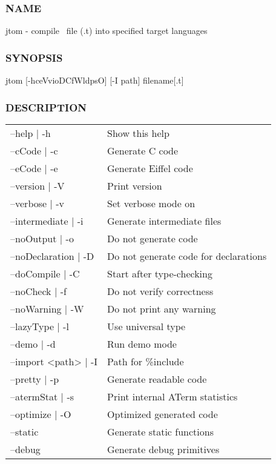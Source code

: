 \subsubsection{NAME}
     jtom - compile \TOM\ file (.t) into specified target languages

\subsubsection{SYNOPSIS}
     jtom [-hceVvioDCfWldpsO] [-I path] filename[.t]

\subsubsection{DESCRIPTION}
\begin{tabular}{|l|l|}
\hline
--help | -h&             Show this help \\
--cCode | -c&           Generate C code \\
        --eCode | -e&           Generate Eiffel code \\
        --version | -V&         Print version \\
        --verbose | -v&         Set verbose mode on \\
        --intermediate | -i&    Generate intermediate files \\
        --noOutput | -o&                Do not generate code \\
        --noDeclaration | -D&   Do not generate code for declarations \\
        --doCompile | -C&       Start after type-checking \\
        --noCheck | -f&         Do not verify correctness \\
        --noWarning | -W&       Do not print any warning \\
        --lazyType | -l&                Use universal type \\
        --demo | -d&            Run demo mode \\
        --import <path> | -I&   Path for \%include \\
        --pretty | -p&          Generate readable code \\
        --atermStat | -s&       Print internal ATerm statistics \\
        --optimize | -O&                Optimized generated code \\
        --static&               Generate static functions \\
        --debug&                Generate debug primitives \\
\hline
\end{tabular}

